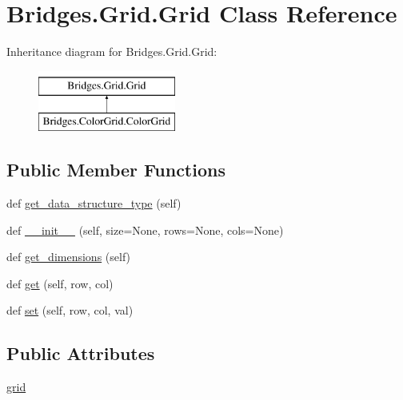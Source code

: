 \hypertarget{class_bridges_1_1_grid_1_1_grid}{}\section{Bridges.\+Grid.\+Grid Class Reference}
\label{class_bridges_1_1_grid_1_1_grid}
Inheritance diagram for Bridges.\+Grid.\+Grid\+:\begin{figure}[H]
\begin{center}
\leavevmode
\includegraphics[height=2.000000cm]{class_bridges_1_1_grid_1_1_grid}
\end{center}
\end{figure}
\subsection*{Public Member Functions}
\begin{DoxyCompactItemize}
\item 
def \mbox{\hyperlink{class_bridges_1_1_grid_1_1_grid_ac3ee98a6b4b9c743f2116f7c855f3fd3}{get\+\_\+data\+\_\+structure\+\_\+type}} (self)
\item 
def \mbox{\hyperlink{class_bridges_1_1_grid_1_1_grid_a5a0a993fcdb28d59bfc32024a7dea0ae}{\+\_\+\+\_\+init\+\_\+\+\_\+}} (self, size=None, rows=None, cols=None)
\item 
def \mbox{\hyperlink{class_bridges_1_1_grid_1_1_grid_af077067d396e080403231f5834dbdbb0}{get\+\_\+dimensions}} (self)
\item 
def \mbox{\hyperlink{class_bridges_1_1_grid_1_1_grid_ae4848ca073fcc0b8e657b2bd5cd5efa4}{get}} (self, row, col)
\item 
def \mbox{\hyperlink{class_bridges_1_1_grid_1_1_grid_a85ead00286be2a6947637f2665dfe973}{set}} (self, row, col, val)
\end{DoxyCompactItemize}
\subsection*{Public Attributes}
\begin{DoxyCompactItemize}
\item 
\mbox{\hyperlink{class_bridges_1_1_grid_1_1_grid_a7e3fd2bd085616102e390737a096bcac}{grid}}
\end{DoxyCompactItemize}
